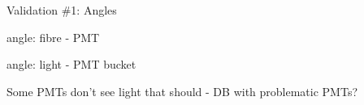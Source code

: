 \documentclass[xcolor=table]{beamer}
\begin{document}
\begin{frame}{Validation \#1: Angles}
\begin{minipage}{0.5\textwidth}
\noindent{}
\center angle: fibre - PMT
\end{minipage}%
\begin{minipage}{0.5\textwidth}
\noindent{}
\center angle: light - PMT bucket
\end{minipage}
\center Some PMTs don't see light that should - DB with problematic PMTs?
\end{frame}
\end{document}
